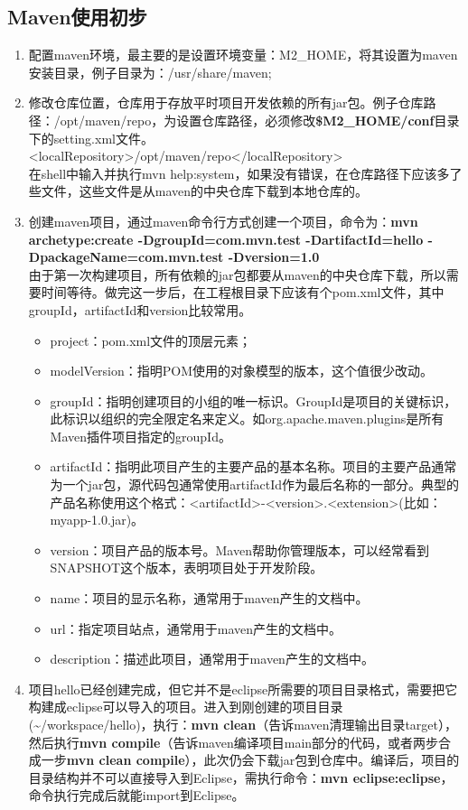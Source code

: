 \subsection{Maven使用初步}
\begin{enumerate}[(1)]
\item 配置maven环境，最主要的是设置环境变量：M2\_HOME，将其设置为maven安装目录，例子目录为：/usr/share/maven;
\item 修改仓库位置，仓库用于存放平时项目开发依赖的所有jar包。例子仓库路径：/opt/maven/repo，为设置仓库路径，必须修改\textbf{\${M2\_HOME}/conf}目录下的setting.xml文件。\\
<localRepository>/opt/maven/repo</localRepository> \\
在shell中输入并执行mvn help:system，如果没有错误，在仓库路径下应该多了些文件，这些文件是从maven的中央仓库下载到本地仓库的。
\item 创建maven项目，通过maven命令行方式创建一个项目，命令为：\textbf{mvn archetype:create -DgroupId=com.mvn.test -DartifactId=hello -DpackageName=com.mvn.test -Dversion=1.0}\\
由于第一次构建项目，所有依赖的jar包都要从maven的中央仓库下载，所以需要时间等待。做完这一步后，在工程根目录下应该有个pom.xml文件，其中groupId，artifactId和version比较常用。
\begin{itemize}
\item project：pom.xml文件的顶层元素；
\item modelVersion：指明POM使用的对象模型的版本，这个值很少改动。
\item groupId：指明创建项目的小组的唯一标识。GroupId是项目的关键标识，此标识以组织的完全限定名来定义。如org.apache.maven.plugins是所有Maven插件项目指定的groupId。
\item artifactId：指明此项目产生的主要产品的基本名称。项目的主要产品通常为一个jar包，源代码包通常使用artifactId作为最后名称的一部分。典型的产品名称使用这个格式：<artifactId>-<version>.<extension>(比如：myapp-1.0.jar)。
\item version：项目产品的版本号。Maven帮助你管理版本，可以经常看到SNAPSHOT这个版本，表明项目处于开发阶段。
\item name：项目的显示名称，通常用于maven产生的文档中。
\item url：指定项目站点，通常用于maven产生的文档中。
\item description：描述此项目，通常用于maven产生的文档中。
\end{itemize}
\item 项目hello已经创建完成，但它并不是eclipse所需要的项目目录格式，需要把它构建成eclipse可以导入的项目。进入到刚创建的项目目录(\textasciitilde/workspace/hello)，执行：\textbf{mvn clean}（告诉maven清理输出目录target），然后执行\textbf{mvn compile}（告诉maven编译项目main部分的代码，或者两步合成一步\textbf{mvn clean compile}），此次仍会下载jar包到仓库中。编译后，项目的目录结构并不可以直接导入到Eclipse，需执行命令：\textbf{mvn eclipse:eclipse}，命令执行完成后就能import到Eclipse。

\end{enumerate}
